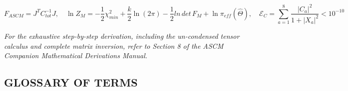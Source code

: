 \documentclass[aps,prd,onecolumn,superscriptaddress,nofootinbib,longbibliography,10pt]{revtex4-2}
\begin{document}
  \[ F_{ASCM} = J^T C_{tot}^{-1} J, \quad \ln Z_M = -\frac{1}{2}\chi_{min}^2 + \frac{k}{2}\ln(2\pi) - \frac{1}{2}\mathit{ln}\,\mathit{det}\,F_M + \ln\pi_{eff}(\hat{\Theta}), \quad \mathcal{E}_C = \sum_{a=1}^8 \frac{|C_a|^2}{1 + |X_a|^2} < 10^{-10} \]
  
    \textit{For the exhaustive step-by-step derivation, including the un-condensed tensor calculus and complete matrix inversion, refer to Section 8 of the ASCM Companion Mathematical Derivations Manual.}
  


 

  
\subsection*{GLOSSARY OF TERMS}

  
\end{document}
